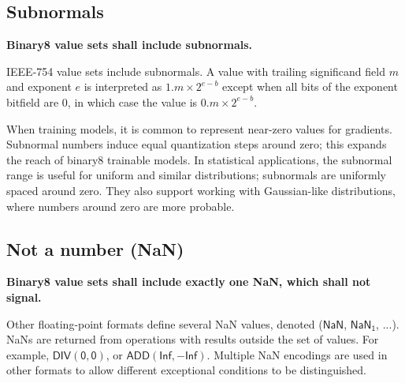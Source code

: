 \documentclass{article}
\def\val#1{$\mathsf{#1}$}
\newcommand{\spec}[1]{{\bf #1}}
\begin{document}
\subsection{Subnormals}

\spec{Binary8 value sets shall include subnormals.}

IEEE-754 value sets include subnormals.  A value with trailing significand field $m$ and exponent $e$ is interpreted as $1.m \times 2^{e-b}$ except when all bits of the exponent bitfield are 0, 
in which case the value is $0.m \times 2^{e-b}$.

When training models, it is common to represent near-zero values for gradients.
Subnormal numbers induce equal quantization steps around zero; this expands the reach of binary8 trainable models.
In statistical applications, the subnormal range is useful for uniform and similar distributions; subnormals are uniformly spaced around zero.
They also support working with Gaussian-like distributions, where numbers around zero are more probable.

\subsection{Not a number (NaN)}
\spec{Binary8 value sets shall include exactly one NaN, which shall not signal.}

Other floating-point formats define several NaN values, denoted (\val{NaN}, \val{NaN_1}, $...$).
NaNs are returned from operations with results outside the set of values.
For example, \val{DIV(0,0)}, or \val{ADD(Inf, -Inf)}.
Multiple NaN encodings are used in other formats to allow different exceptional conditions to be distinguished.
\end{document}
